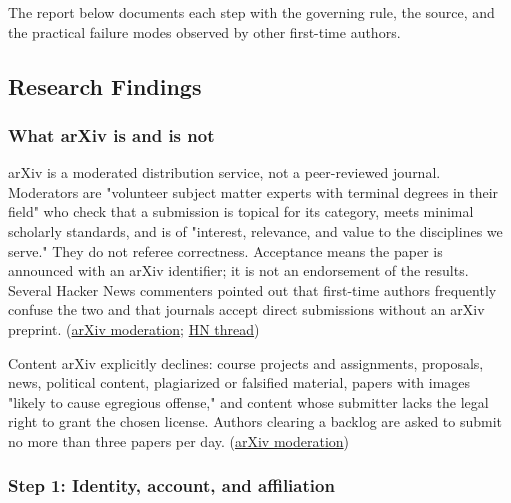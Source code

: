 \documentclass[twocolumn,10pt,letterpaper]{article}
\begin{document}
The report below documents each step with the governing rule, the source, and the practical failure modes observed by other first-time authors.


\subsection{Research Findings}

\subsubsection{What arXiv is and is not}

arXiv is a moderated distribution service, not a peer-reviewed journal. Moderators are "volunteer subject matter experts with terminal degrees in their field" who check that a submission is topical for its category, meets minimal scholarly standards, and is of "interest, relevance, and value to the disciplines we serve." They do not referee correctness. Acceptance means the paper is announced with an arXiv identifier; it is not an endorsement of the results. Several Hacker News commenters pointed out that first-time authors frequently confuse the two and that journals accept direct submissions without an arXiv preprint. (\href{https://info.arxiv.org/help/moderation/index.html}{arXiv moderation}; \href{https://news.ycombinator.com/item?id=46243256}{HN thread})


Content arXiv explicitly declines: course projects and assignments, proposals, news, political content, plagiarized or falsified material, papers with images "likely to cause egregious offense," and content whose submitter lacks the legal right to grant the chosen license. Authors clearing a backlog are asked to submit no more than three papers per day. (\href{https://info.arxiv.org/help/moderation/index.html}{arXiv moderation})


\subsubsection{Step 1: Identity, account, and affiliation}
\end{document}
